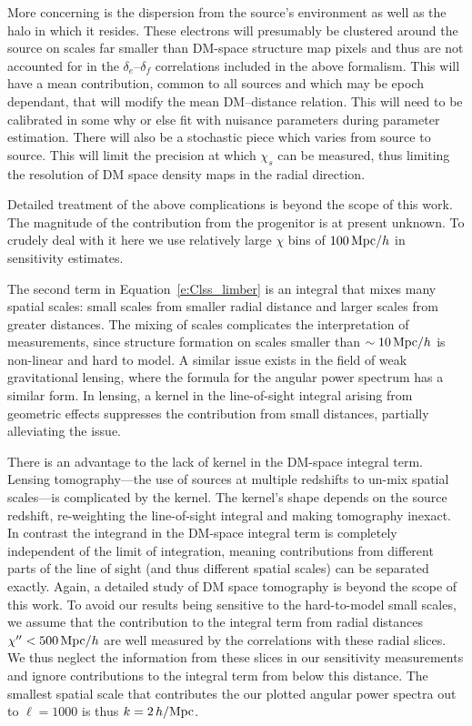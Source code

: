 \documentclass[twocolumn,prl,nofootinbib,floatfix]{revtex4-1}
\begin{document}
More concerning is the dispersion from the source's environment
as well as the halo in which it resides. These electrons will presumably be
clustered around the source on scales far smaller than DM-space
structure map pixels and thus are not accounted for in the $\delta_e$--$\delta_f$
correlations included in the above formalism.  This will have a mean
contribution, common to all sources and which may be epoch dependant, that will
modify the mean DM--distance relation. This will need to be calibrated in some
why or else fit with nuisance parameters during parameter estimation.  There
will also be a stochastic piece which varies from source to source.  This will
limit the precision at which $\chi_s$ can be measured, thus limiting the
resolution of DM space density maps in the radial direction.

Detailed treatment of the above complications is beyond the scope of this
work. The magnitude of the contribution from the progenitor is at present
unknown. To crudely deal with it here we use relatively large
$\chi$ bins of $100\,{\rm Mpc}/h$ in sensitivity estimates.

The second term in Equation~\ref{e:Clss_limber} is an integral that mixes
many spatial scales: small scales from smaller radial distance and larger
scales from greater distances. The mixing of scales complicates the
interpretation of measurements, since structure formation on scales smaller
than $\sim10\,{\rm Mpc}/h$ is non-linear and hard to model. A similar issue
exists in the field of weak gravitational lensing, where the formula for the
angular power spectrum has a similar form.  In lensing, a kernel in
the line-of-sight integral arising from geometric effects suppresses the
contribution from small distances, partially alleviating the issue.

There is an advantage to the lack of kernel in the DM-space integral term.
Lensing tomography---the use of sources at multiple redshifts to un-mix
spatial scales---is complicated by the kernel. The kernel's shape depends on
the source redshift, re-weighting the line-of-sight integral and
making tomography inexact.  In contrast the integrand in the DM-space integral
term is completely independent of the limit of integration, meaning
contributions from different parts of the line of sight (and thus different
spatial scales) can be separated exactly. Again, a detailed study of DM space
tomography is beyond the scope of this work.  To avoid our results being
sensitive to the hard-to-model small scales, we assume that the contribution to the
integral term from radial distances $\chi'' < 500\,{\rm Mpc}/h$ are well
measured by the correlations with these radial slices. We thus neglect the
information from these slices in our sensitivity measurements and ignore
contributions to the integral term from below this distance. The smallest
spatial scale that contributes the our plotted angular power spectra out to
$\ell=1000$ is thus $k=2\,h/{\rm Mpc}$.
\end{document}
